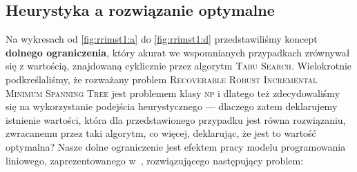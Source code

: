 \subsection{Heurystyka a rozwiązanie optymalne}

Na wykresach od \ref{fig:rrimst1:a} do \ref{fig:rrimst1:d} przedstawiliśmy koncept \textbf{dolnego ograniczenia}, który akurat we wspomnianych przypadkach zrównywał się z wartością, znajdowaną cyklicznie przez algorytm \textsc{Tabu Search}. Wielokrotnie podkreślaliśmy, że rozważany problem \textsc{Recoverable Robust Incremental Minimum Spanning Tree} jest problemem klasy \textsc{np} i dlatego też zdecydowaliśmy się na wykorzystanie podejścia heurystycznego --- dlaczego zatem deklarujemy istnienie wartości, która dla przedstawionego przypadku jest równa rozwiązaniu, zwracanemu przez taki algorytm, co więcej, deklarując, że jest to wartość optymalna? Nasze dolne ograniczenie jest efektem pracy modelu programowania liniowego, zaprezentowanego w~\cite{DBLP:journals/corr/HradovichKZ16}, rozwiązującego następujący problem:


